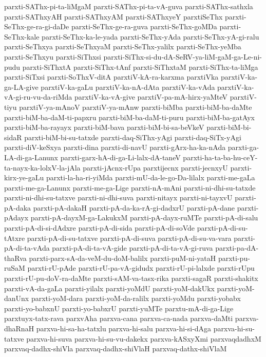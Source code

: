 {parxti-SAThx-pi-ta-liMgaM
parxti-SAThx-pi-ta-vA-guva
parxti-SAThx-sathxla
parxti-SAThxyAH
parxti-SAThxyAM
parxti-SAThxyeY
parxtiSeThx
parxti-SeThx-ge-ra-gi-daDe
parxti-SeThx-ge-ra-guva
parxti-SeThx-goMDa
parxti-SeThx-kale
parxti-SeThx-ka-le-yada
parxti-SeThx-yAda
parxti-SeThx-yA-gi-ralu
parxti-SeThxya
parxti-SeThxyaM
parxti-SeThx-yalilx
parxti-SeThx-yeMba
parxti-SeThxyu
parxti-SiThxsi
parxti-SiThx-si-du-dA-SeRV-ya-liM-gaM-ga-Le-ni-pudu
parxti-SiThxtA
parxti-SiThx-tAnf
parxti-SiThxtaM
parxti-SiThx-ta-liMga
parxti-SiTxsi
parxti-SoThxV-ditA
parxtiV-kA-ra-karxma
parxtiVka
parxtiV-ka-ga-LA-give
parxtiV-ka-gaLu
parxtiV-ka-nA-dAta
parxtiV-ka-vAda
parxtiV-ka-vA-gi-ru-vu-da-riMda
parxtiV-ka-vA-give
parxtiV-pa-mA-hirx-yaMteV
parxtiV-tiyu
parxtiV-ya-mAnoV
parxtiV-ya-mAnw
parxti-biMba
parxti-biM-ba-daMte
parxti-biM-ba-daM-ti-papxru
parxti-biM-ba-daM-ti-puru
parxti-biM-ba-gatAyx
parxti-biM-ba-rayayx
parxti-biM-bava
parxti-biM-bi-sa-beVkeV
parxti-biM-bi-sidaR
parxti-biM-bi-su-tatxde
parxti-daq-SiThx-yAgi
parxti-daq-SiTx-yAgi
parxti-diV-keSxya
parxti-dina
parxti-di-navU
parxti-gArx-ha-ka-nAda
parxti-ga-LA-di-ga-Lanunx
parxti-garx-hA-di-ga-Li-lalx-dA-taneV
parxti-ha-ta-ba-hu-ceY-ta-nayx-ka-lolxV-la-jAla
parxti-jAcnx-rUpa
parxtijecnx
parxti-jecnxyU
parxti-kirx-ye-gaLu
parxti-la-ha-ri-yiMda
parxti-mU-da-le-go-Da-lilalx
parxti-me-gaLa
parxti-me-ga-Lanunx
parxti-me-ga-Lige
parxti-nA-mAni
parxti-ni-dhi-su-tatxde
parxti-ni-dhi-su-tatxve
parxti-ni-dhi-suva
parxti-nitayx
parxti-ni-tayxvU
parxti-pA-daka
parxti-pA-dakaH
parxti-pA-da-ka-rA-gi-dadxrU
parxti-pA-dane
parxti-pAdayx
parxti-pA-dayxM-ga-LakukxM
parxti-pA-dayx-ruMTe
parxti-pA-di-salu
parxti-pA-di-si-dAdxre
parxti-pA-di-sida
parxti-pA-di-soVde
parxti-pA-di-su-tAtxre
parxti-pA-di-su-tatxve
parxti-pA-di-suva
parxti-pA-di-su-va-vara
parxti-pA-di-ta-vAda
parxti-pA-di-ta-vA-gide
parxti-pA-di-ta-vA-gi-ruva
parxti-pa-dA-thaRva
parxti-parx-sA-da-veM-du-doM-balilx
parxti-puM-ni-yataH
parxti-pu-ruSaM
parxti-rU-pAde
parxti-rU-pa-vA-gidudx
parxti-rU-pi-lalxde
parxti-rUpu
parxti-rU-pu-doV-ra-daMte
parxti-sAM-va-tasx-rika
parxti-sagaR
parxti-shakitx
parxti-vA-da-gaLa
parxti-yilalx
parxti-yoMdU
parxti-yoM-dakUkx
parxti-yoM-danUnx
parxti-yoM-dara
parxti-yoM-da-ralilx
parxti-yoMdu
parxti-yobabx
parxti-yo-babxnU
parxti-yo-babxrU
parxti-yuMTe
parxtu-mA-di-ga-Lige
parxtuyx-tatx-rava
parxvAha
parxva-cana
parxva-ca-nada
parxva-daMti
parxva-dhaRnaH
parxva-hi-sa-ha-tatxlu
parxva-hi-salu
parxva-hi-si-dAga
parxva-hi-su-tatxve
parxva-hi-suva
parxva-hi-su-vu-dakekx
parxva-kASxyXmi
parxvaqdadhxM
parxvaq-dadhx-shiVla
parxvaq-dadhx-shiVlaH
parxvaq-dathx-shiVlaM
}
